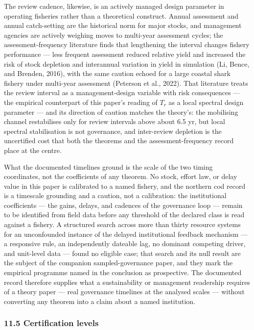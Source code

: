 \documentclass[11pt]{article}
\begin{document}
The review cadence, likewise, is an actively managed design parameter in
operating fisheries rather than a theoretical construct. Annual
assessment and annual catch-setting are the historical norm for major
stocks, and management agencies are actively weighing moves to
multi-year assessment cycles; the assessment-frequency literature finds
that lengthening the interval changes fishery performance --- less
frequent assessment reduced relative yield and increased the risk of
stock depletion and interannual variation in yield in simulation (Li,
Bence, and Brenden, 2016), with the same caution echoed for a large
coastal shark fishery under multi-year assessment (Peterson et al.,
2022). That literature treats the review interval as a management-design
variable with risk consequences --- the empirical counterpart of this
paper's reading of \(T_r\) as a local spectral design parameter --- and
its direction of caution matches the theory's: the mobilising channel
restabilises only for review intervals above about 6.5 yr, but local
spectral stabilisation is not governance, and inter-review depletion is
the uncertified cost that both the theorems and the assessment-frequency
record place at the centre.

What the documented timelines ground is the scale of the two timing
coordinates, not the coefficients of any theorem. No stock, effort law,
or delay value in this paper is calibrated to a named fishery, and the
northern cod record is a timescale grounding and a caution, not a
calibration: the institutional coefficients --- the gains, delays, and
cadences of the governance loop --- remain to be identified from field
data before any threshold of the declared class is read against a
fishery. A structured search across more than thirty resource systems
for an unconfounded instance of the delayed institutional feedback
mechanism --- a responsive rule, an independently dateable lag, no
dominant competing driver, and unit-level data --- found no eligible
case; that search and its null result are the subject of the companion
sampled-governance paper, and they mark the empirical programme named in
the conclusion as prospective. The documented record therefore supplies
what a sustainability or management readership requires of a theory
paper --- real governance timelines at the analysed scales --- without
converting any theorem into a claim about a named institution.

\subsubsection{11.5 Certification levels}\label{certification-levels}
\end{document}
